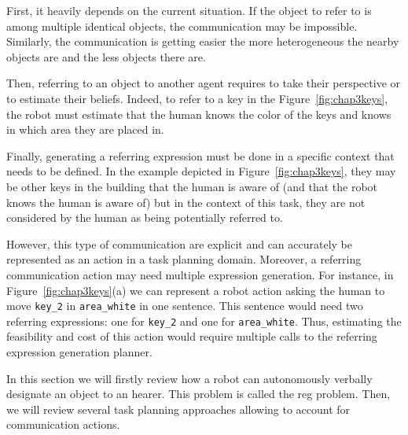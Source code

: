 \documentclass[a4paper,11pt,twoside]{StyleThese}
\begin{document}
First, it heavily depends on the current situation. If the object to refer to is among multiple identical objects, the communication may be impossible. Similarly, the communication is getting easier the more heterogeneous the nearby objects are and the less objects there are. 

Then, referring to an object to another agent requires to take their perspective or to estimate their beliefs. Indeed, to refer to a key in the Figure~\ref{fig:chap3keys}, the robot must estimate that the human knows the color of the keys and knows in which area they are placed in.

Finally, generating a referring expression must be done in a specific context that needs to be defined. In the example depicted in Figure~\ref{fig:chap3keys}, they may be other keys in the building that the human is aware of (and that the robot knows the human is aware of) but in the context of this task, they are not considered by the human as being potentially referred to.

However, this type of communication are explicit and can accurately be represented as an action in a task planning domain. Moreover, a referring communication action may need multiple expression generation. For instance, in Figure~\ref{fig:chap3keys}(a) we can represent a robot action asking the human to move \verb'key_2' in \verb'area_white' in one sentence. This sentence would need two referring expressions: one for \verb'key_2' and one for \verb'area_white'. Thus, estimating the feasibility and cost of this action would require multiple calls to the referring expression generation planner.

In this section we will firstly review how a robot can autonomously verbally designate an object to an hearer. This problem is called the \acrfull{reg} problem.
Then, we will review several task planning approaches allowing to account for communication actions.
\end{document}
